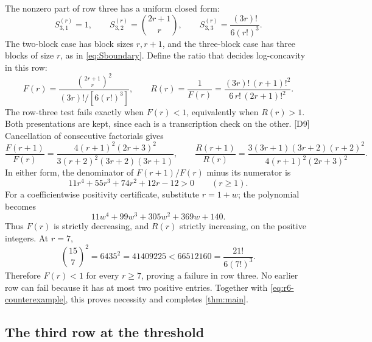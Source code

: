 \documentclass[11pt,a4paper]{article}
\numberwithin{equation}{section}
\theoremstyle{definition}
\theoremstyle{remark}
\newcommand{\dup}[1]{{\small\textsf{\color{MutedInk}[#1]}}}
\begin{document}
The nonzero part of row three has a uniform closed form:
\begin{equation}\label{eq:row3}
 S^{(r)}_{3,1}=1,\qquad
 S^{(r)}_{3,2}=\binom{2r+1}{r},\qquad
 S^{(r)}_{3,3}=\frac{(3r)!}{6(r!)^3}.
\end{equation}
The two-block case has block sizes $r,r+1$, and the three-block case
has three blocks of size $r$, as in \eqref{eq:Sboundary}.
Define the ratio that decides log-concavity in this row:
\begin{equation}\label{eq:Fr}
 F(r)=\frac{\binom{2r+1}{r}^{\!2}}{(3r)!/[6(r!)^3]},\qquad
 R(r)=\frac1{F(r)}=\frac{(3r)!\,(r+1)!^2}{6\,r!\,(2r+1)!^2}.
\end{equation}
The row-three test fails exactly when $F(r)<1$, equivalently when $R(r)>1$.
Both presentations are kept, since each is a transcription check on the
other. \dup{D9} Cancellation of consecutive factorials gives
\begin{equation}\label{eq:F-ratio}
 \frac{F(r+1)}{F(r)}
  =\frac{4(r+1)^2(2r+3)^2}{3(r+2)^2(3r+2)(3r+1)},\qquad
 \frac{R(r+1)}{R(r)}
  =\frac{3(3r+1)(3r+2)(r+2)^2}{4(r+1)^2(2r+3)^2}.
\end{equation}
In either form, the denominator of $F(r+1)/F(r)$ minus its numerator is
\begin{equation}\label{eq:ratio-gap}
 11r^4+55r^3+74r^2+12r-12>0\qquad(r\ge1).
\end{equation}
For a coefficientwise positivity certificate, substitute $r=1+w$; the
polynomial becomes
\[
 11w^4+99w^3+305w^2+369w+140 .
\]
Thus $F(r)$ is strictly decreasing, and $R(r)$ strictly increasing, on the
positive integers. At $r=7$,
\[
 \binom{15}{7}^2=6435^2=41409225<66512160
             =\frac{21!}{6(7!)^3}.
\]
Therefore $F(r)<1$ for every $r\ge7$, proving a failure in row three.
No earlier row can fail because it has at most two positive entries.
Together with \eqref{eq:r6-counterexample}, this proves necessity and
completes \cref{thm:main}.

\subsection{The third row at the threshold}
\end{document}
